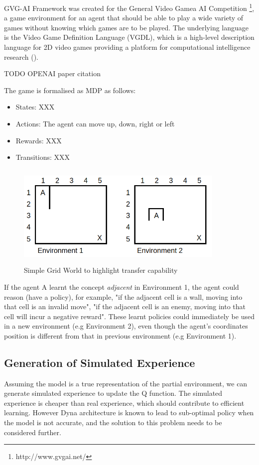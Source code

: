GVG-AI Framework was created for the General Video Gamea AI Competition \footnote{http://www.gvgai.net/}, a game environment for an agent that should be able to play a wide variety of games without knowing which games are to be played.
The underlying language is the Video Game Definition Language (VGDL), which is a high-level description language for 2D video games providing a platform for computational intelligence research (\cite{Schaul2013}).

TODO OPENAI paper citation

The game is formalised as MDP as follows:

\begin{itemize}

\item States: XXX
\item Actions: The agent can move up, down, right or left
\item Rewards: XXX
\item Transitions: XXX

\end{itemize}


\begin{figure}[!htb]
\centering
\includegraphics[width=10cm, height=5cm]{./figures/grid_world}
\caption{Simple Grid World to highlight transfer capability }
\label{grid_world}
\end{figure}
If the agent A learnt the concept \textit{adjacent} in Environment 1, the agent could reason (have a policy), for example, "if the adjacent cell is a wall, moving into that cell is an invalid move", "if the adjacent cell is an enemy, moving into that cell will incur a negative reward". These learnt policies could immediately be used in a new environment (e.g Environment 2), even though the agent's coordinates position is different from that in previous environment (e.g Environment 1).
\subsection{Generation of Simulated Experience}
Assuming the model is  a true representation of the partial environment, we can generate simulated experience to update the Q function. The simulated experience is cheaper than real experience, which should contribute to efficient learning. However Dyna architecture is known to lead to sub-optimal policy when the model is not accurate, and the solution to this problem needs to be considered further.

